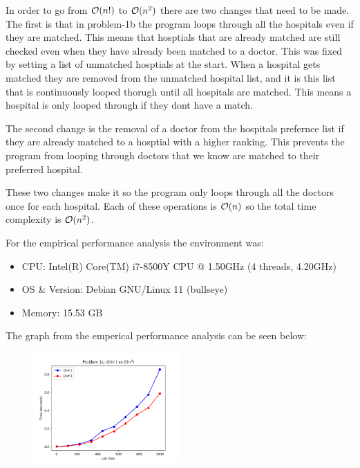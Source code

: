 \documentclass{hw}
\begin{document}
\begin{problem}
    \begin{solution}
    In order to go from $\mathcal{O}(n!)$ to $\mathcal{O}(n^2)$ there are two changes that need to be made. The first is that in problem-1b the program loops through all the hospitals even if they are matched. This means that hosptials that are already matched are still checked even when they have already been matched to a doctor. This was fixed by setting a list of unmatched hosptials at the start. When a hospital gets matched they are removed from the unmatched hospital list, and it is this list that is continuously looped thorugh until all hospitals are matched. This means a hospital is only looped through if they dont have a match.
    
    The second change is the removal of a doctor from the hospitals prefernce list if they are already matched to a hosptial with a higher ranking. This prevents the program from looping through doctors that we know are matched to their preferred hospital.
    
    These two changes make it so the program only loops through all the doctors once for each hospital. Each of these operations is $\mathcal{O}(n)$ so the total time complexity is $\mathcal{O}(n^2)$.
    
    For the empirical performance analysis the environment was:
        \begin{itemize}
            \item CPU: Intel(R) Core(TM) i7-8500Y CPU @ 1.50GHz (4 threads, 4.20GHz)
            \item OS \& Version: Debian GNU/Linux 11 (bullseye)
            \item Memory: 15.53 GB
        \end{itemize}
        
    The graph from the emperical performance analysis can be seen below:
    \begin{figure}[h]
      \centering
          \includegraphics[width=0.5\textwidth]{figures/problem-1c.png}
    \end{figure}
    
    \end{solution}

\end{problem}
\end{document}
